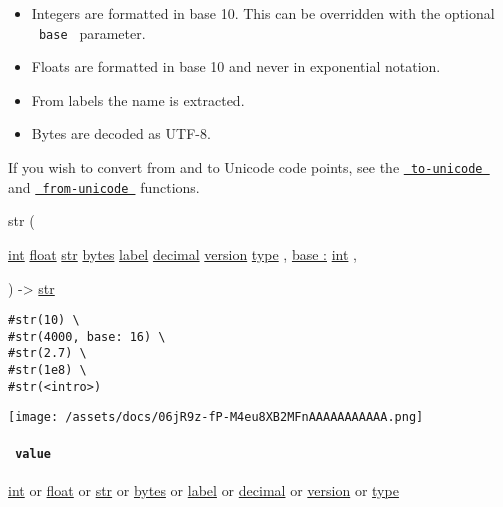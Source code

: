 \begin{itemize}
\tightlist
\item
  Integers are formatted in base 10. This can be overridden with the
  optional \texttt{\ base\ } parameter.
\item
  Floats are formatted in base 10 and never in exponential notation.
\item
  From labels the name is extracted.
\item
  Bytes are decoded as UTF-8.
\end{itemize}

If you wish to convert from and to Unicode code points, see the
\href{/docs/reference/foundations/str/\#definitions-to-unicode}{\texttt{\ to-unicode\ }}
and
\href{/docs/reference/foundations/str/\#definitions-from-unicode}{\texttt{\ from-unicode\ }}
functions.

{ str } (

{ \href{/docs/reference/foundations/int/}{int}
\href{/docs/reference/foundations/float/}{float}
\href{/docs/reference/foundations/str/}{str}
\href{/docs/reference/foundations/bytes/}{bytes}
\href{/docs/reference/foundations/label/}{label}
\href{/docs/reference/foundations/decimal/}{decimal}
\href{/docs/reference/foundations/version/}{version}
\href{/docs/reference/foundations/type/}{type} , } {
\hyperref[constructor-parameters-base]{base :}
\href{/docs/reference/foundations/int/}{int} , }

) -\textgreater{} \href{/docs/reference/foundations/str/}{str}

\begin{verbatim}
#str(10) \
#str(4000, base: 16) \
#str(2.7) \
#str(1e8) \
#str(<intro>)
\end{verbatim}

\texttt{[image: /assets/docs/06jR9z-fP-M4eu8XB2MFnAAAAAAAAAAA.png]}

\paragraph{\texorpdfstring{\texttt{\ value\ }}{ value }}\label{constructor-value}

\href{/docs/reference/foundations/int/}{int} {or}
\href{/docs/reference/foundations/float/}{float} {or}
\href{/docs/reference/foundations/str/}{str} {or}
\href{/docs/reference/foundations/bytes/}{bytes} {or}
\href{/docs/reference/foundations/label/}{label} {or}
\href{/docs/reference/foundations/decimal/}{decimal} {or}
\href{/docs/reference/foundations/version/}{version} {or}
\href{/docs/reference/foundations/type/}{type}

